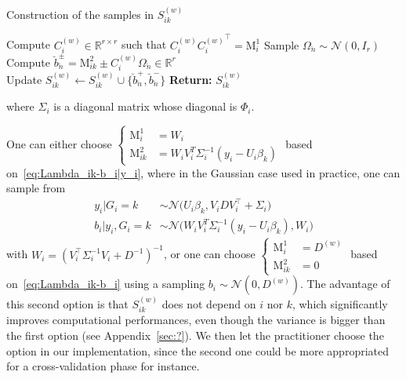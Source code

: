 \documentclass[11pt]{article}
\newcommand{\cN}{\mathcal N}
\newcommand{\R}{\mathds R}
\begin{document}
\vspace{.5cm}

\begin{algorithm}[H]
\DontPrintSemicolon
\caption{Construction of the samples in $S_{ik}^{(w)}$}
\label{alg:construct-set-S}
Compute $C_i^{(w)} \in \R^{r \times r}$ such that 
$C_i^{(w)}{C_i^{(w)}}^\top = \text{M}_i^1$  \nonumber
{}    
{ 
  Sample $\Omega_{\breve{n}} \sim \cN(0, I_r)$ \\
  Compute $\breve{b}_{\breve{n}}^\pm = \text{M}_{ik}^2 \pm C_i^{(w)} \Omega_{\breve{n}} \in \R^r$ \\
  Update $S_{ik}^{(w)} \leftarrow S_{ik}^{(w)} \cup \{\breve{b}_{\breve{n}}^+, \breve{b}_{\breve{n}}^- \}$
}
\textbf{Return:} {$S_{ik}^{(w)}$}
\end{algorithm}

\vspace{.5cm}

\noindent where $\Sigma_i$ is a diagonal matrix whose diagonal is $\Phi_i$.

\noindent One can either choose $\left\{ \begin{array}{ll} \text{M}_i^1 &= W_i \\ \text{M}_{ik}^2 &= W_iV_i^T\Sigma_i^{-1}(y_i - U_i\beta_k) \end{array} \right.$ based on~\eqref{eq:Lambda_ik-b_i|y_i}, where in the Gaussian case used in practice, one can sample from
\begin{align*}
  y_i | G_i = k &\sim \cN\big(U_i\beta_k, V_iDV_i^\top + \Sigma_i\big) \\
  b_i | y_i, G_i=k &\sim \cN \big(W_iV_i^T\Sigma_i^{-1}(y_i - U_i\beta_k), W_i\big)  
\end{align*}
with $W_i = (V_i^\top\Sigma_i^{-1}V_i + D^{-1})^{-1}$, or one can choose $\left\{ \begin{array}{ll} \text{M}_i^1 &= D^{(w)} \\ \text{M}_{ik}^2 &= 0 \end{array} \right.$ based on~\eqref{eq:Lambda_ik-b_i} using a sampling $b_i \sim \cN(0, D^{(w)})$. The advantage of this second option is that $S_{ik}^{(w)}$ does not depend on $i$ nor $k$, which significantly improves computational performances, even though the variance is bigger than the first option (see Appendix~\ref{sec:?}). We then let the practitioner choose the option in our implementation, since the second one could be more appropriated for a cross-validation phase for instance.
\end{document}
